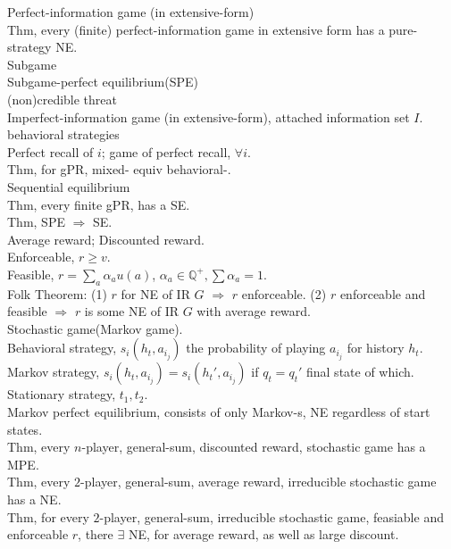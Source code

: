 \documentclass[paper=a4, fontsize=11pt]{scrartcl} %
\numberwithin{equation}{section} %
\numberwithin{figure}{section} %
\numberwithin{table}{section} %
\begin{document}
Perfect-information game (in extensive-form)\\
Thm, every (finite) perfect-information game in extensive form has a pure-strategy NE.\\
Subgame\\
Subgame-perfect equilibrium(SPE)\\
(non)credible threat\\
Imperfect-information game (in extensive-form), attached information set $I$.\\
behavioral strategies\\
Perfect recall of $i$; game of perfect recall, $\forall i$.\\
Thm, for gPR, mixed- equiv behavioral-.\\
Sequential equilibrium\\
Thm, every finite gPR, has a SE.\\
Thm, SPE $\Rightarrow$ SE.\\
Average reward; Discounted reward.\\
Enforceable, $r\geq v$.\\
Feasible, $r = \sum_a \alpha_a u(a)$, $\alpha_a\in \mathbb{Q}^+, \sum \alpha_a=1$.\\
Folk Theorem: (1) $r$ for NE of IR $G$ $\Rightarrow$ $r$ enforceable. (2) $r$ enforceable and feasible $\Rightarrow$ $r$ is some NE of IR $G$ with average reward.\\
Stochastic game(Markov game).\\
Behavioral strategy, $s_i(h_t,a_{i_j})$ the probability of playing $a_{i_j}$ for history $h_t$.\\
Markov strategy, $s_i(h_t, a_{i_j}) = s_i(h_t', a_{i_j})$ if $q_t=q_t'$ final state of which.\\
Stationary strategy, $t_1,t_2$.\\
Markov perfect equilibrium, consists of only Markov-s, NE regardless of start states.\\
Thm, every $n$-player, general-sum, discounted reward, stochastic game has a MPE.\\
Thm, every $2$-player, general-sum, average reward, irreducible stochastic game has a NE.\\
Thm, for every $2$-player, general-sum, irreducible stochastic game, feasiable and enforceable $r$, there $\exists$ NE, for average reward, as well as large discount.\\
\end{document}
